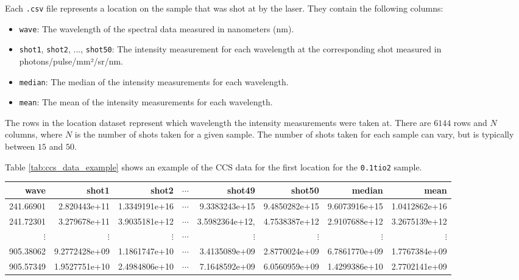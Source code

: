 Each \texttt{.csv} file represents a location on the sample that was shot at by the laser.
They contain the following columns:

\begin{itemize}
    \item \texttt{wave}: The wavelength of the spectral data measured in nanometers (nm).
    \item \texttt{shot1}, \texttt{shot2}, ..., \texttt{shot50}: The intensity measurement for each wavelength at the corresponding shot measured in photons/pulse/mm²/sr/nm.
    \item \texttt{median}: The median of the intensity measurements for each wavelength.
    \item \texttt{mean}: The mean of the intensity measurements for each wavelength.
\end{itemize}

The rows in the location dataset represent which wavelength the intensity measurements were taken at.
There are $6144$ rows and $N$ columns, where $N$ is the number of shots taken for a given sample.
The number of shots taken for each sample can vary, but is typically between $15$ and $50$.

Table \ref{tab:ccs_data_example} shows an example of the CCS data for the first location for the \texttt{0.1tio2} sample.

\begin{table*}[ht]
\centering
\begin{tabular}{rrrrrrrr}
\toprule
     wave &        shot1 &      shot2 &      $\cdots$ &       shot49 &       shot50 & median & mean \\
\midrule
241.66901 & 2.820443e+11 & 1.3349191e+16 & $\cdots$ & 9.3383243e+15 & 9.4850282e+15 & 9.6073916e+15 & 1.0412862e+16 \\
241.72301 & 3.279678e+11 & 3.9035181e+12 & $\cdots$ & 3.5982364e+12, & 4.7538387e+12 & 2.9107688e+12 & 3.2675139e+12 \\
$\vdots$  & $\vdots$     & $\vdots$ & $\cdots$ & $\vdots$ & $\vdots$ & $\vdots$ & $\vdots$ \\
905.38062 & 9.2772428e+09 & 1.1861747e+10 & $\cdots$ & 3.4135089e+09 & 2.8770024e+09 & 6.7861770e+09 & 1.7767384e+09 \\
905.57349 & 1.9527751e+10 & 2.4984806e+10 & $\cdots$ & 7.1648592e+09 & 6.0560959e+09 & 1.4299386e+10 & 2.7702141e+09 \\ 
\bottomrule
\end{tabular}
\caption{Example of CCS data for the first sample in the \texttt{0.1tio2} directory.}
\label{tab:ccs_data_example}
\end{table*}